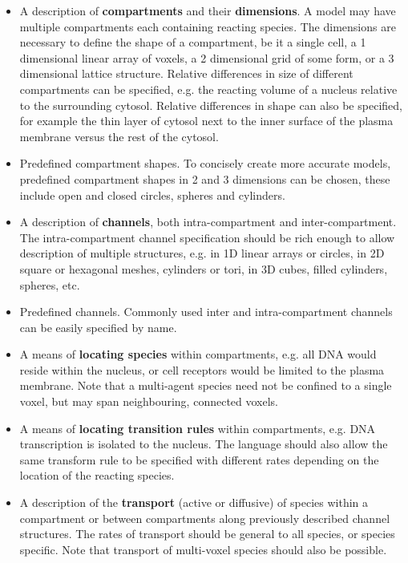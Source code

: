 \begin{itemize}
 \item A description of \textbf{compartments} and their \textbf{dimensions}. A model may have multiple compartments each containing reacting species. The dimensions are necessary to define the shape of a compartment, be it a single cell, a 1 dimensional linear array of voxels, a 2 dimensional grid of some form, or a 3 dimensional lattice structure. Relative differences in size of different compartments can be specified, e.g. the reacting volume of a nucleus relative to the surrounding cytosol. Relative differences in shape can also be specified, for example the thin layer of cytosol next to the inner surface of the plasma membrane versus the rest of the cytosol.

 \item Predefined compartment shapes. To concisely create more accurate models, predefined compartment shapes in 2 and 3 dimensions can be chosen, these include open and closed circles, spheres and cylinders. 

 \item A description of \textbf{channels}, both intra-compartment and inter-compartment. The intra-compartment channel specification should be rich enough to allow description of multiple structures, e.g. in 1D linear arrays or circles, in 2D square or hexagonal meshes, cylinders or tori, in 3D cubes, filled cylinders, spheres, etc.

 \item Predefined channels. Commonly used inter and intra-compartment channels can be easily specified by name.

 \item A means of \textbf{locating species} within compartments, e.g. all DNA would reside within the nucleus, or cell receptors would be limited to the plasma membrane. Note that a multi-agent species need not be confined to a single voxel, but may span neighbouring, connected voxels.

 \item A means of \textbf{locating transition rules} within compartments, e.g. DNA transcription is isolated to the nucleus. The language should also allow the same transform rule to be specified with different rates depending on the location of the reacting species.

 \item A description of the \textbf{transport} (active or diffusive) of species within a compartment or between compartments along previously described channel structures. The rates of transport should be general to all species, or species specific. Note that transport of multi-voxel species should also be possible.

\end{itemize}


